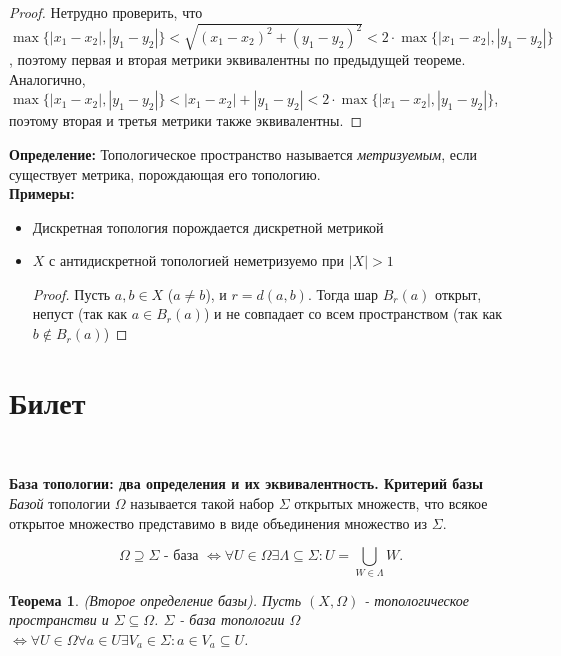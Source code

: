 \documentclass[a4paper,100pt]{article}
\theoremstyle{indented}
\newtheorem{theorem}{Теорема}
\begin{document}
\begin{proof} Нетрудно проверить, что $\max\{|x_1-x_2|, |y_1-y_2|\}<\sqrt{(x_1-x_2)^2+(y_1-y_2)^2} < 2 \cdot \max\{|x_1-x_2|, |y_1-y_2|\}$, поэтому первая и вторая метрики эквивалентны по предыдущей теореме. Аналогично, $\max\{|x_1-x_2|, |y_1-y_2|\}< |x_1-x_2|+|y_1-y_2| < 2 \cdot \max\{|x_1-x_2|, |y_1-y_2|\}$, поэтому вторая и третья метрики также эквивалентны.
\end{proof}

\textbf{Определение: } Топологическое пространство \hypertarget{n15}{называется} \textit{метризуемым}, если существует метрика, порождающая его топологию.
\\

\textbf{Примеры: } 
\begin{itemize}
    \item Дискретная топология порождается дискретной метрикой 
    \item $X$ с антидискретной топологией неметризуемо при $|X|>1$
    
    \begin{proof} Пусть $a, b \in X$ ($a \neq b$), и $r=d(a, b)$. Тогда шар $B_r(a)$ открыт, непуст (так как $a \in B_r(a)$) и не совпадает со всем пространством (так как $b \notin B_r(a)$)
    \end{proof}
\end{itemize}

\section{Билет} \

\medskip

\textbf{База топологии: два определения и их эквивалентность. Критерий базы}\\

\textit{Базой} \hypertarget{n16}{топологии} $\Omega$ называется такой набор $\Sigma$ открытых множеств, что всякое открытое множество представимо в виде объединения множество из $\Sigma$.

\[
    \Omega \supseteq \Sigma \text{ - база } \Leftrightarrow \forall U \in \Omega \exists \Lambda \subseteq \Sigma : U = \bigcup_{W\in \Lambda} W.
\]

\begin{theorem}
    (Второе определение базы). Пусть $(X, \Omega)$ - топологическое пространстви и $\Sigma \subseteq \Omega$. $\Sigma$ - база топологии $\Omega$ $\Longleftrightarrow \forall U \in \Omega \forall a \in U \exists V_a \in \Sigma : a\in V_a \subseteq U$.
\end{theorem}
\end{document}
